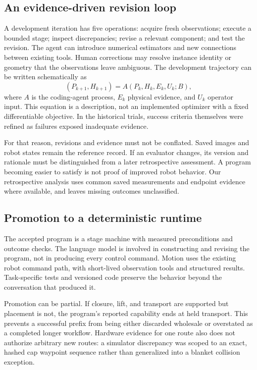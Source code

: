\subsection{An evidence-driven revision loop}
A development iteration has five operations: acquire fresh observations;
execute a bounded stage; inspect discrepancies; revise a relevant component;
and test the revision. The agent can introduce numerical estimators and new
connections between existing tools. Human corrections may resolve instance
identity or geometry that the observations leave ambiguous. The development
trajectory can be written schematically as
\begin{equation}
 (P_{k+1},H_{k+1})=A(P_k,H_k,E_k,U_k;B),
\label{eq:update}
\end{equation}
where $A$ is the coding-agent process, $E_k$ physical evidence, and $U_k$
operator input. This equation is a description, not an implemented optimizer
with a fixed differentiable objective. In the historical trials, success
criteria themselves were refined as failures exposed inadequate evidence.

For that reason, revisions and evidence must not be conflated. Saved images
and robot states remain the reference record. If an evaluator changes, its
version and rationale must be distinguished from a later retrospective
assessment. A program becoming easier to satisfy is not proof of improved
robot behavior. Our retrospective analysis uses common saved measurements and
endpoint evidence where available, and leaves missing outcomes unclassified.

\subsection{Promotion to a deterministic runtime}
The accepted program is a stage machine with measured preconditions and
outcome checks. The language model is involved in constructing and revising
the program, not in producing every control command. Motion uses the existing
robot command path, with short-lived observation tools and structured results.
Task-specific tests and versioned code preserve the behavior beyond the
conversation that produced it.

Promotion can be partial. If closure, lift, and transport are supported but
placement is not, the program's reported capability ends at held transport.
This prevents a successful prefix from being either discarded wholesale or
overstated as a completed longer workflow. Hardware evidence for one route
also does not authorize arbitrary new routes: a simulator discrepancy was
scoped to an exact, hashed cap waypoint sequence rather than generalized into
a blanket collision exception.

